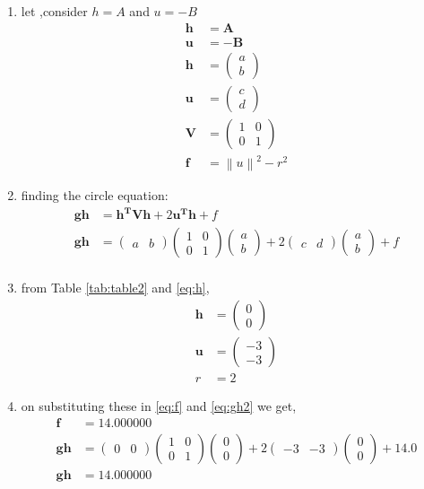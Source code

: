 \documentclass[11pt, a4paper]{article}
\newcommand{\myvec}[1]{\ensuremath{\begin{pmatrix}#1\end{pmatrix}}}
\let\vec\mathbf
\providecommand{\norm}[1]{\left\lVert#1\right\rVert}
\begin{document}
\begin{enumerate}
\begin{enumerate}

\item let ,consider $h = A$ and $u=-B$
\begin{align}
	\vec{h} &=\vec{A} \label{eq:h} \\
	\vec{u} &=\vec{-B} \\
	\vec{h} &=\myvec{a \\ b} \\
\vec{u} &= \myvec{c \\ d}  \\
	\vec{V} &= \myvec{1 & 0 \\ 0 & 1} \\
	\vec{f} &= \norm{u}^2-r^2   \label{eq:f}
\end{align}

\item finding the circle equation: 
\begin{align}
	\vec{gh} &= \vec{h^T}\vec{V}\vec{h} + 2\vec{u^T}\vec{h} + f    \label{eq:gh}\\
	\vec{gh} &= \myvec{a &b}\myvec{1 & 0 \\ 0 & 1}\myvec{a \\ b} + 2\myvec{c& d}\myvec{a \\b } + f   \label{eq:gh2} \\
\end{align}

\item from Table \ref{tab:table2} and \eqref{eq:h}, 
\begin{align}
\vec{h} &=\myvec{0 \\ 0} \\
\vec{u} &= \myvec{-3 \\ -3} \\
r &= 2 
\end{align}
\item on substituting these in \eqref{eq:f} and  \eqref{eq:gh2} we get,
\begin{align}
\vec{f} &=14.000000 \\
\vec{gh} &= \myvec{0 &0 }\myvec{1 & 0 \\ 0 & 1}\myvec{0 \\ 0} + 2\myvec{-3& -3}\myvec{0 \\0 } + 14.0 \\
\vec{gh} &= 14.000000  
\end{align}


\end{enumerate}
\end{enumerate}
\end{document}
